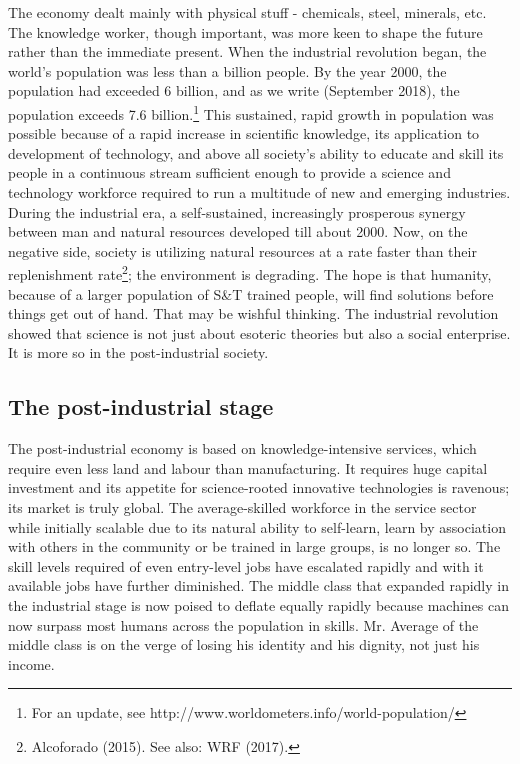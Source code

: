 \begin{multicols}{2}
The economy dealt mainly with physical stuff - chemicals, steel, minerals, etc. The knowledge worker, though important, was more keen to shape the future rather than the immediate present. When the industrial revolution began, the world's population was less than a billion people. By the year 2000, the population had exceeded 6 billion, and as we write (September 2018), the population exceeds 7.6 billion.\footnote{For an update, see http://www.worldometers.info/world-population/} This sustained, rapid growth in population was possible because of a rapid increase in scientific knowledge, its application to development of technology, and above all society's ability to educate and skill its people in a continuous stream sufficient enough to provide a science and technology workforce required to run a multitude of new and emerging industries. During the industrial era, a self-sustained, increasingly prosperous synergy between man and natural resources developed till about 2000. Now, on the negative side, society is utilizing natural resources at a rate faster than their replenishment rate\footnote{Alcoforado (2015). See also: WRF (2017).}; the environment is degrading. The hope is that humanity, because of a larger population of S\&T trained people, will find solutions before things get out of hand. That may be wishful thinking. The industrial revolution showed that science is not just about esoteric theories but also a social enterprise. It is more so in the post-industrial society.

\subsection*{The post-industrial stage}

The post-industrial economy is based on knowledge-intensive services, which require even less land and labour than manufacturing. It requires huge capital investment and its appetite for science-rooted innovative technologies is ravenous; its market is truly global. The average-skilled workforce in the service sector while initially scalable due to its natural ability to self-learn, learn by association with others in the community or be trained in large groups, is no longer so. The skill levels required of even entry-level jobs have escalated rapidly and with it available jobs have further diminished. The middle class that expanded rapidly in the industrial stage is now poised to deflate equally rapidly because machines can now surpass most humans across the population in skills. Mr. Average of the middle class is on the verge of losing his identity and his dignity, not just his income.


\end{multicols}
